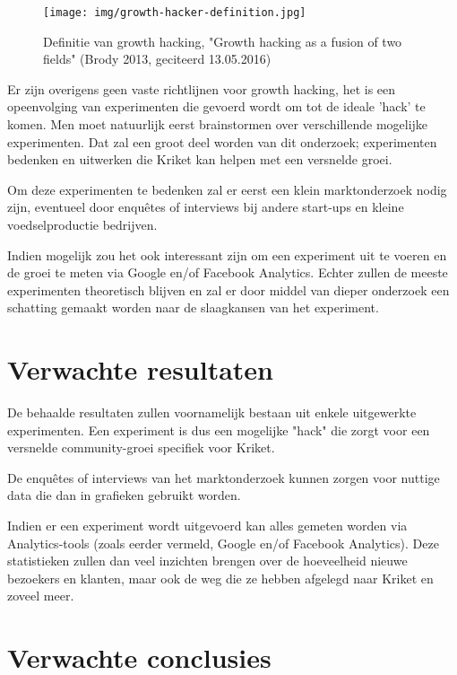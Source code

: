 \begin{figure}[h!]
	\texttt{[image: img/growth-hacker-definition.jpg]}
	\caption{Definitie van growth hacking, "Growth hacking as a fusion of two fields"  (Brody 2013, geciteerd 13.05.2016)}
	\label{fig:defGrowthHacker}
\end{figure}

Er zijn overigens geen vaste richtlijnen voor growth hacking, het is een opeenvolging van experimenten die gevoerd wordt om tot de ideale 'hack' te komen. Men moet natuurlijk eerst brainstormen over verschillende mogelijke experimenten. Dat zal een groot deel worden van dit onderzoek; experimenten bedenken en uitwerken die Kriket kan helpen met een versnelde groei.

Om deze experimenten te bedenken zal er eerst een klein marktonderzoek nodig zijn, eventueel door enquêtes of interviews bij andere start-ups en kleine voedselproductie bedrijven. 

Indien mogelijk zou het ook interessant zijn om een experiment uit te voeren en de groei te meten via Google en/of Facebook Analytics. Echter zullen de meeste experimenten theoretisch blijven en zal er door middel van dieper onderzoek een schatting gemaakt worden naar de slaagkansen van het experiment.

\section{Verwachte resultaten}
\label{sec:verwachte_resultaten}

De behaalde resultaten zullen voornamelijk bestaan uit enkele uitgewerkte experimenten. Een experiment is dus een mogelijke "hack" die zorgt voor een versnelde community-groei specifiek voor Kriket. 

De enquêtes of interviews van het marktonderzoek kunnen zorgen voor nuttige data die dan in grafieken gebruikt worden.

Indien er een experiment wordt uitgevoerd kan alles gemeten worden via Analytics-tools (zoals eerder vermeld, Google en/of Facebook Analytics). Deze statistieken zullen dan veel inzichten brengen over de hoeveelheid nieuwe bezoekers en klanten, maar ook de weg die ze hebben afgelegd naar Kriket en zoveel meer.


\section{Verwachte conclusies}
\label{sec:verwachte_conclusies}

